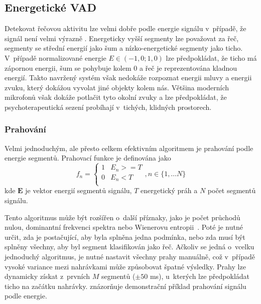 \subsection{Energetické VAD}
\label{subsection:Energy_VAD}
Detekovat řečovou aktivitu lze velmi dobře podle energie signálu v~případě, že signál není velmi výrazně . Energeticky vyšší segmenty lze považovat za řeč, segmenty se střední energií jako šum a nízko-energetické segmenty jako ticho. V~případě normalizované energie $E \in (-1,0;1,0)$ lze předpokládat, že ticho má zápornou energii, šum se pohybuje kolem 0 a řeč je reprezentována kladnou energií. Takto navržený systém však nedokáže rozpoznat energii mluvy a energii zvuku, který dokážou vyvolat jiné objekty kolem nás. Většina moderních mikrofonů však dokáže potlačit tyto okolní zvuky a lze předpokládat, že psychoterapeutická sezení probíhají v~tichých, klidných prostorech.

\subsubsection{Prahování}
\label{subsection:VAD_threshold}
Velmi jednoduchým, ale přesto celkem efektivním algoritmem je prahování podle energie segmentů. Prahovací funkce je definována jako  
\begin{equation}
    \label{eqn:E_threshold}
    f_{n} = \begin{cases}
                   1               & E_{n} >= T\\
                   0               & E_{n} < T\\
            \end{cases}, n \in \{1, \dots N\}
\end{equation}
kde $\mathbf{E}$ je vektor energií segmentů signálu, $T$ energetický práh a $N$ počet segmentů signálu.

Tento algoritmus může být rozšířen o~další příznaky, jako je počet průchodů nulou, dominantní frekvenci spektra nebo Wienerovu entropii~\cite{VAD_SFM}. Poté je nutné určit, zda je postačující, aby byla splněna jedna podmínka, nebo zda musí být splněny všechny, aby byl segment klasifikován jako řeč. Ačkoliv se jedná o~vcelku jednoduchý algoritmus, je nutné nastavit všechny prahy manuálně, což v~případě vysoké variance mezi nahrávkami může způsobovat špatné výsledky. Prahy lze dynamicky získat z~prvních $M$ segmentů ($\pm 50$ ms), u~kterých lze předpokládat ticho na začátku nahrávky.  znázorňuje demonstrační příklad prahování signálu podle energie.

